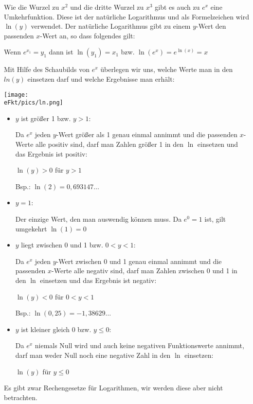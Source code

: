Wie die Wurzel zu \(x^2\) und die dritte Wurzel zu \(x^3\) gibt es auch zu \(e^x\) eine Umkehrfunktion. Diese ist der natürliche Logarithmus und als Formelzeichen wird \(\ln(y)\) verwendet. Der natürliche Logarithmus gibt zu einem \(y\)-Wert den passenden \(x\)-Wert an, so dass folgendes gilt:
\begin{tcolorbox}\centering
	\textcolor{loestc}{Wenn \(e^{x_1}=y_1\) dann ist \(\ln(y_1)=x_1\) bzw. \(\ln(e^x)=e^{\ln(x)}=x\)}
\end{tcolorbox}
Mit Hilfe des Schaubilds von \(e^x\) überlegen wir uns, welche Werte man in den \(ln(y)\) einsetzen darf und welche Ergebnisse man erhält:

\begin{minipage}{\textwidth}\centering
	\texttt{[image: \\eFkt/pics/ln.png]}
\end{minipage}\vspace{0.2cm}
\begin{itemize}
	\item \(y\) ist größer 1 bzw. \(y>1\):

	\textcolor{loes}{Da \(e^x\) jeden \(y\)-Wert größer als 1 genau einmal annimmt und die passenden \(x\)-Werte alle positiv sind, darf man Zahlen größer 1 in den \(\ln\) einsetzen und das Ergebnis ist positiv:}

	\textcolor{loes}{\(\ln(y)>0\) für \(y>1\)}

	\textcolor{loes}{Bsp.: \(\ln(2)=0,693147\dots\)}
	\item \(y=1\):

	\textcolor{loes}{Der einzige Wert, den man auswendig können muss. Da \(e^0=1\) ist, gilt umgekehrt \(\ln(1)=0\)}
	\item \(y\) liegt zwischen 0 und 1 bzw. \(0<y<1\):

	\textcolor{loes}{Da \(e^x\) jeden \(y\)-Wert zwischen 0 und 1 genau einmal annimmt und die passenden \(x\)-Werte alle negativ sind, darf man Zahlen zwischen 0 und 1 in den \(\ln\) einsetzen und das Ergebnis ist negativ:}

	\textcolor{loes}{\(\ln(y)<0\) für \(0<y<1\)}

	\textcolor{loes}{Bsp.: \(\ln(0,25)=-1,38629\dots\)}
	\item \(y\) ist kleiner gleich 0 bzw. \(y\leq0\):

	\textcolor{loes}{Da \(e^x\) niemals Null wird und auch keine negativen Funktionswerte annimmt, darf man weder Null noch eine negative Zahl in den \(\ln\) einsetzen:}

	\textcolor{loes}{\(\ln(y)\) \Lightning \normalsize für \(y\leq0\)}
\end{itemize}
\newpage
Es gibt zwar Rechengesetze für Logarithmen, wir werden diese aber nicht betrachten.

